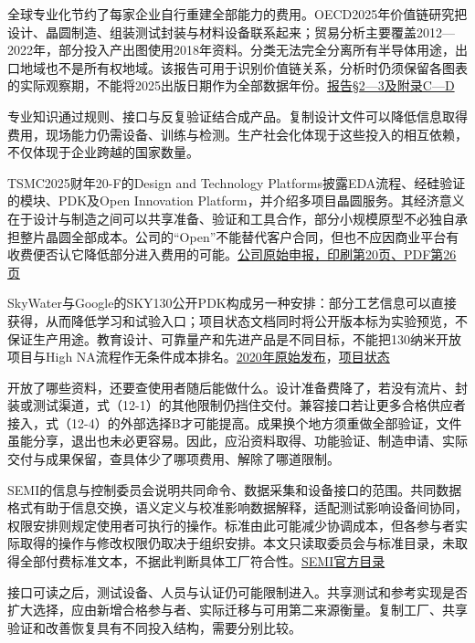 \documentclass[UTF8,fontset=windows,12pt,a4paper,oneside,openany]{ctexbook}
\begin{document}
全球专业化节约了每家企业自行重建全部能力的费用。OECD2025年价值链研究把设计、晶圆制造、组装测试封装与材料设备联系起来；贸易分析主要覆盖2012—2022年，部分投入产出图使用2018年资料。分类无法完全分离所有半导体用途，出口地域也不是所有权地域。该报告可用于识别价值链关系，分析时仍须保留各图表的实际观察期，不能将2025出版日期作为全部数据年份。\href{https://www.oecd.org/content/dam/oecd/en/publications/reports/2025/06/mapping-the-semiconductor-value-chain_5ba52971/4154cdbf-en.pdf}{报告§2—3及附录C—D}

专业知识通过规则、接口与反复验证结合成产品。复制设计文件可以降低信息取得费用，现场能力仍需设备、训练与检测。生产社会化体现于这些投入的相互依赖，不仅体现于企业跨越的国家数量。

TSMC2025财年20-F的Design and Technology Platforms披露EDA流程、经硅验证的模块、PDK及Open Innovation Platform，并介绍多项目晶圆服务。其经济意义在于设计与制造之间可以共享准备、验证和工具合作，部分小规模原型不必独自承担整片晶圆全部成本。公司的“Open”不能替代客户合同，但也不应因商业平台有收费便否认它降低部分进入费用的可能。\href{https://investor.tsmc.com/sites/ir/sec-filings/2025_20F\%20Report.pdf}{公司原始申报，印刷第20页、PDF第26页}

SkyWater与Google的SKY130公开PDK构成另一种安排：部分工艺信息可以直接获得，从而降低学习和试验入口；项目状态文档同时将公开版本标为实验预览，不保证生产用途。教育设计、可靠量产和先进产品是不同目标，不能把130纳米开放项目与High NA流程作无条件成本排名。\href{https://www.skywatertechnology.com/open-source-asics-take-a-giant-leap-forward-with-first-ever-open-foundry-pdk/}{2020年原始发布}，\href{https://skywater-pdk.readthedocs.io/en/main/status.html}{项目状态}

开放了哪些资料，还要查使用者随后能做什么。设计准备费降了，若没有流片、封装或测试渠道，式（12-1）的其他限制仍挡住交付。兼容接口若让更多合格供应者接入，式（12-4）的外部选择B才可能提高。成果换个地方须重做全部验证，文件虽能分享，退出也未必更容易。因此，应沿资料取得、功能验证、制造申请、实际交付与成果保留，查具体少了哪项费用、解除了哪道限制。

SEMI的信息与控制委员会说明共同命令、数据采集和设备接口的范围。共同数据格式有助于信息交换，语义定义与校准影响数据解释，适配测试影响设备间协同，权限安排则规定使用者可执行的操作。标准由此可能减少协调成本，但各参与者实际取得的操作与修改权限仍取决于组织安排。本文只读取委员会与标准目录，未取得全部付费标准文本，不据此判断具体工厂符合性。\href{https://www.semi.org/en/products-services/standards/information_and_control}{SEMI官方目录}

接口可读之后，测试设备、人员与认证仍可能限制进入。共享测试和参考实现是否扩大选择，应由新增合格参与者、实际迁移与可用第二来源衡量。复制工厂、共享验证和改善恢复具有不同投入结构，需要分别比较。
\end{document}
